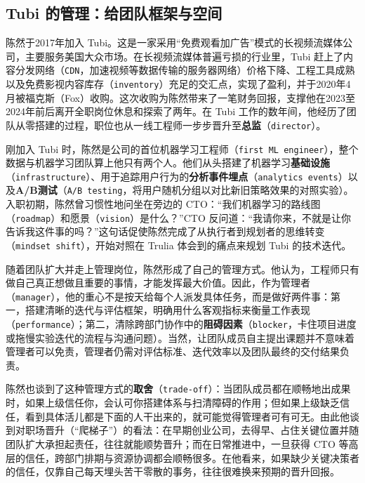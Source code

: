 \documentclass[UTF8,a4paper,11pt,fontset=fandol]{ctexart}
\begin{document}
\subsection{Tubi 的管理：给团队框架与空间}
陈然于2017年加入 Tubi。这是一家采用“免费观看加广告”模式的长视频流媒体公司，主要服务美国大众市场。在长视频流媒体普遍亏损的行业里，Tubi 赶上了内容分发网络（\texttt{CDN}，加速视频等数据传输的服务器网络）价格下降、工程工具成熟以及免费影视内容库存（\texttt{inventory}）充足的交汇点，实现了盈利，并于2020年4月被福克斯（Fox）收购。这次收购为陈然带来了一笔财务回报，支撑他在2023至2024年前后离开全职岗位休息和探索了两年。在 Tubi 工作的数年间，他经历了团队从零搭建的过程，职位也从一线工程师一步步晋升至\textbf{总监}（\texttt{director}）。

刚加入 Tubi 时，陈然是公司的首位机器学习工程师（\texttt{first ML engineer}），整个数据与机器学习团队算上他只有两个人。他们从头搭建了机器学习\textbf{基础设施}（\texttt{infrastructure}）、用于追踪用户行为的\textbf{分析事件埋点}（\texttt{analytics events}）以及\textbf{A/B测试}（\texttt{A/B testing}，将用户随机分组以对比新旧策略效果的对照实验）。入职初期，陈然曾习惯性地问坐在旁边的 CTO：“我们机器学习的路线图（\texttt{roadmap}）和愿景（\texttt{vision}）是什么？”CTO 反问道：“我请你来，不就是让你告诉我这件事的吗？”这句话促使陈然完成了从执行者到规划者的思维转变（\texttt{mindset shift}），开始对照在 Trulia 体会到的痛点来规划 Tubi 的技术迭代。

随着团队扩大并走上管理岗位，陈然形成了自己的管理方式。他认为，工程师只有做自己真正想做且重要的事情，才能发挥最大价值。因此，作为管理者（\texttt{manager}），他的重心不是按天给每个人派发具体任务，而是做好两件事：第一，搭建清晰的迭代与评估框架，明确用什么客观指标来衡量工作表现（\texttt{performance}）；第二，清除跨部门协作中的\textbf{阻碍因素}（\texttt{blocker}，卡住项目进度或拖慢实验迭代的流程与沟通问题）。当然，让团队成员自主提出课题并不意味着管理者可以免责，管理者仍需对评估标准、迭代效率以及团队最终的交付结果负责。

陈然也谈到了这种管理方式的\textbf{取舍}（\texttt{trade-off}）：当团队成员都在顺畅地出成果时，如果上级信任你，会认可你搭建体系与扫清障碍的作用；但如果上级缺乏信任，看到具体活儿都是下面的人干出来的，就可能觉得管理者可有可无。由此他谈到对职场晋升（“爬梯子”）的看法：在早期创业公司，去得早、占住关键位置并随团队扩大承担起责任，往往就能顺势晋升；而在日常推进中，一旦获得 CTO 等高层的信任，跨部门排期与资源协调都会顺畅很多。在他看来，如果缺少关键决策者的信任，仅靠自己每天埋头苦干零散的事务，往往很难换来预期的晋升回报。
\end{document}
